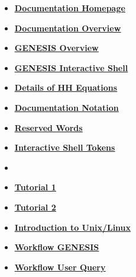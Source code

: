 \documentclass[12pt]{article}
\begin{document}
\begin{itemize}
\item \href{../documentation-homepage/documentation-homepage.pdf}{\bf \underline{Documentation Homepage}}

\item \href{../documentation-overview/documentation-overview.pdf}{\bf \underline{Documentation Overview}}

\item \href{../genesis-overview/genesis-overview.pdf}{\bf \underline{GENESIS Overview}}

\item \href{../gshell/gshell.pdf}{\bf \underline{GENESIS Interactive Shell}}

\item \href{../hh-model-details/hh-model-details.pdf}{\bf \underline{Details of HH Equations}}

\item \href{../notation/notation.pdf}{\bf \underline{Documentation Notation}}

\item \href{../reserved-words/reserved-words.pdf}{\bf \underline{Reserved Words}}

\item \href{../shell-tokens/shell-tokens.pdf}{\bf \underline{Interactive Shell Tokens}}

\item \href{../tutorial-jaeger/tutorial-jaeger.pdf}{\bf \underline{}}

\item \href{../tutorial1/tutorial1.pdf}{\bf \underline{Tutorial 1}}

\item \href{../tutorial2/tutorial2.pdf}{\bf \underline{Tutorial 2}}

\item \href{../unix-linux/unix-linux.pdf}{\bf \underline{Introduction to Unix/Linux}}

\item \href{../workflow-genesis/workflow-genesis.pdf}{\bf \underline{Workflow GENESIS}}

\item \href{../workflow-user-query/workflow-user-query.pdf}{\bf \underline{Workflow User Query}}


\end{itemize}

\end{document}
